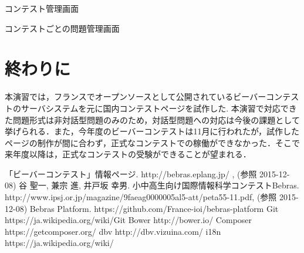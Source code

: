 \documentclass[a4paper]{jarticle}
\makeatletter
\newenvironment{figurehere}
  {\def\@captype{figure}}
  {}
\makeatother
\begin{document}
\begin{multicols}{2}
\begin{figurehere}
\begin{center}
\end{center}
\caption{コンテスト管理画面}\label{fig:11}
\end{figurehere}

\begin{figurehere}
\begin{center}
\end{center}
\caption{コンテストごとの問題管理画面}\label{fig:12}
\end{figurehere}

\section{終わりに}
本演習では，フランスでオープンソースとして公開されているビーバーコンテストのサーバシステムを元に国内コンテストページを試作した. 本演習で対応できた問題形式は非対話型問題のみのため，対話型問題への対応は今後の課題として挙げられる．また，今年度のビーバーコンテストは11月に行われたが，試作したページの制作が間に合わず，正式なコンテストでの稼働ができなかった．そこで来年度以降は，正式なコンテストの受験ができることが望まれる．

\end{multicols}

\begin{thebibliography}{1}

 「ビーバーコンテスト」情報ページ.  http://bebras.eplang.jp/ , (参照 2015-12-08)
 谷 聖一, 兼宗 進, 井戸坂 幸男. 小中高生向け国際情報科学コンテストBebras.  http://www.ipsj.or.jp/magazine/9faeag0000005al5-att/peta55-11.pdf, (参照 2015-12-08)
 Bebras Platform. https://github.com/France-ioi/bebras-platform
 Git  https://ja.wikipedia.org/wiki/Git
Bower  http://bower.io/
Composer  https://getcomposer.org/
dbv  http://dbv.vizuina.com/
i18n  https://ja.wikipedia.org/wiki/%



\end{thebibliography}
\end{document}
